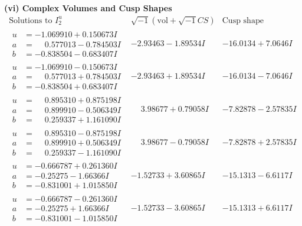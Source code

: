 \documentclass[1p]{elsarticle_modified}
\theoremstyle{definition}
\newcommand{\I}{\sqrt{-1}}
\begin{document}
\newpage\flushleft \textbf{(vi) Complex Volumes and Cusp Shapes}
$$\begin{array}{c|c|c}  
\text{Solutions to }I^u_{2}& \I (\text{vol} + \sqrt{-1}CS) & \text{Cusp shape}\\
 \hline 
\begin{aligned}
u &= -1.069910 + 0.150673 I \\
a &= \phantom{-}0.577013 - 0.784503 I \\
b &= -0.838504 - 0.683407 I\end{aligned}
 & -2.93463 - 1.89534 I & -16.0134 + 7.0646 I \\ \hline\begin{aligned}
u &= -1.069910 - 0.150673 I \\
a &= \phantom{-}0.577013 + 0.784503 I \\
b &= -0.838504 + 0.683407 I\end{aligned}
 & -2.93463 + 1.89534 I & -16.0134 - 7.0646 I \\ \hline\begin{aligned}
u &= \phantom{-}0.895310 + 0.875198 I \\
a &= \phantom{-}0.899910 - 0.506349 I \\
b &= \phantom{-}0.259337 + 1.161090 I\end{aligned}
 & \phantom{-}3.98677 + 0.79058 I & -7.82878 - 2.57835 I \\ \hline\begin{aligned}
u &= \phantom{-}0.895310 - 0.875198 I \\
a &= \phantom{-}0.899910 + 0.506349 I \\
b &= \phantom{-}0.259337 - 1.161090 I\end{aligned}
 & \phantom{-}3.98677 - 0.79058 I & -7.82878 + 2.57835 I \\ \hline\begin{aligned}
u &= -0.666787 + 0.261360 I \\
a &= -0.25275 - 1.66366 I \\
b &= -0.831001 + 1.015850 I\end{aligned}
 & -1.52733 + 3.60865 I & -15.1313 - 6.6117 I \\ \hline\begin{aligned}
u &= -0.666787 - 0.261360 I \\
a &= -0.25275 + 1.66366 I \\
b &= -0.831001 - 1.015850 I\end{aligned}
 & -1.52733 - 3.60865 I & -15.1313 + 6.6117 I \\ \hline\begin{aligned}

\end{aligned}
\end{array}$$
\end{document}

